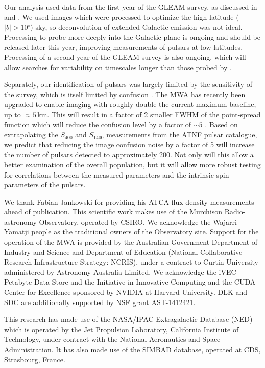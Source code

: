 \documentclass{pasa}%
\newcommand{\degree}{\ensuremath{^\circ}}
\begin{document}
Our analysis used data from the first year of the GLEAM survey, as discussed in \citet{wayth15} and \citet{hurleywalker16}.  We used images which were processed to optimize the high-latitude ($|b|>10\degree$) sky, so deconvolution of extended Galactic emission was not ideal.  Processing to probe more deeply into the Galactic plane is ongoing and should be released later this year, improving measurements of pulsars at low latitudes.  Processing of a second year of the GLEAM survey is also ongoing, which will allow searches for variability on timescales longer than those probed by \citet{bell16}.

Separately, our identification of pulsars was largely limited by the sensitivity of the survey, which is itself limited by confusion \citep{franzen16}.  The MWA has recently been upgraded to enable imaging with roughly double the current maximum baseline, up to $\approx 5\,$km.  This will result in a factor of 2 smaller FWHM of the point-spread function which will reduce the confusion level by a factor of $\sim 5$ \citep{franzen16}. Based on extrapolating the $S_{400}$ and $S_{1400}$ measurements from the ATNF pulsar catalogue, we predict that reducing the image confusion noise by a factor of 5 will increase the number of pulsars detected to approximately 200. Not only will this allow a better examination of the overall population, but it will allow more robust testing for correlations between the measured parameters and the intrinsic spin parameters of the pulsars.


\begin{acknowledgements}
We thank Fabian Jankowski for providing his ATCA flux density measurements ahead of publication.
This scientific work makes use of the Murchison Radio-astronomy Observatory, operated by CSIRO. We acknowledge the Wajarri Yamatji people as the traditional owners of the Observatory site. Support for the operation of the MWA is provided by the Australian Government Department of Industry and Science and Department of Education (National Collaborative Research Infrastructure Strategy: NCRIS), under a contract to Curtin University administered by Astronomy Australia Limited. We acknowledge the iVEC Petabyte Data Store and the Initiative in Innovative Computing and the CUDA Center for Excellence sponsored by NVIDIA at Harvard University.  DLK and SDC are additionally supported by NSF grant AST-1412421. 

This research has made use of the NASA/IPAC Extragalactic Database (NED) which is operated by the Jet Propulsion Laboratory, California Institute of Technology, under contract with the National Aeronautics and Space Administration. It has also made use of the SIMBAD database, operated at CDS, Strasbourg, France.
\end{acknowledgements}




% 


\end{document}
